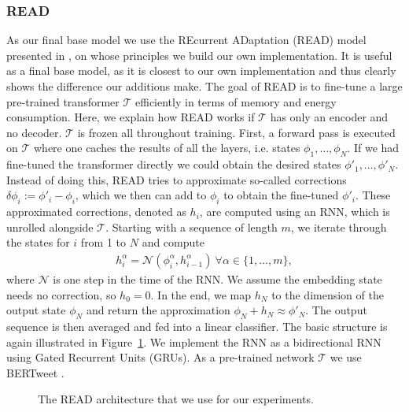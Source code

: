 \documentclass[10pt,conference,compsocconf]{IEEEtran}
\begin{document}
\subsubsection{READ}
As our final base model we use the REcurrent ADaptation (READ) model presented in \cite{read}, on whose principles we build our own implementation. It is useful as a final base model, as it is closest to our own implementation and thus clearly shows the difference our additions make. The goal of READ is to fine-tune a large pre-trained transformer $\mathcal T$ efficiently in terms of memory and energy consumption. Here, we explain how READ works if $\mathcal T$ has only an encoder and no decoder. $\mathcal T$ is frozen all throughout training. First, a forward pass is executed on $\mathcal T$ where one caches the results of all the layers, i.e. states $\phi_1, \dots,\phi_N$. If we had fine-tuned the transformer directly we could obtain the desired states $\phi'_1,\dots,\phi'_N$. Instead of doing this, READ tries to approximate so-called corrections $\delta\phi_i:=\phi'_i-\phi_i$, which we then can add to $\phi_i$ to obtain the fine-tuned $\phi'_i$. These approximated corrections, denoted as $h_i$, are computed using an RNN, which is unrolled alongside $\mathcal T$. Starting with a sequence of length $m$, we iterate through the states for $i$ from 1 to $N$ and compute
\begin{align}
    h_i^\alpha = \mathcal N\left(\phi_i^\alpha, h_{i-1}^\alpha\right)\ \forall\alpha\in\{1,...,m\},
\end{align}
where $\mathcal N$ is one step in the time of the RNN. We assume the embedding state needs no correction, so $h_0=0$. In the end, we map $h_N$ to the dimension of the output state $\phi_N$ and return the approximation $\phi_N + h_N\approx\phi'_N$. The output sequence is then averaged and fed into a linear classifier. The basic structure is again illustrated in Figure~\ref{fig:readarchitecture}.
We implement the RNN as a bidirectional RNN using Gated Recurrent Units (GRUs). As a pre-trained network $\mathcal T$ we use BERTweet \cite{nguyen2020bertweet}.

\begin{figure}
  \centering
  
  \caption{The READ architecture that we use for our experiments.}
  \label{fig:readarchitecture}
\end{figure}
\end{document}

